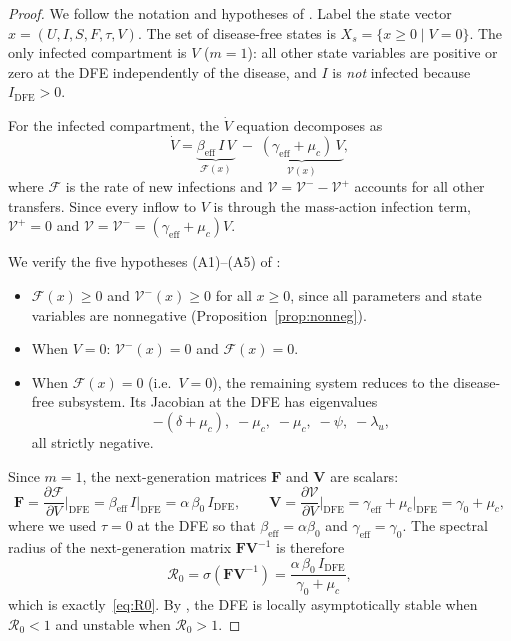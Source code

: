 \documentclass[11pt]{article}
\begin{document}
\begin{proof}
We follow the notation and hypotheses of \cite{vandenDriessche2002}. Label the state vector $x = (U, I, S, F, \tau, V)$. The set of disease-free states is $X_s = \{x \geq 0 \mid V = 0\}$. The only infected compartment is $V$ ($m = 1$): all other state variables are positive or zero at the DFE independently of the disease, and $I$ is \emph{not} infected because $I_{\mathrm{DFE}} > 0$.

For the infected compartment, the $\dot{V}$ equation decomposes as
\[
\dot{V} = \underbrace{\beta_{\mathrm{eff}}\,I\,V}_{\mathcal{F}(x)}
       \;-\; \underbrace{(\gamma_{\mathrm{eff}} + \mu_c)\,V}_{\mathcal{V}(x)},
\]
where $\mathcal{F}$ is the rate of new infections and $\mathcal{V} = \mathcal{V}^{-} - \mathcal{V}^{+}$ accounts for all other transfers. Since every inflow to $V$ is through the mass-action infection term, $\mathcal{V}^{+} = 0$ and $\mathcal{V} = \mathcal{V}^{-} = (\gamma_{\mathrm{eff}} + \mu_c)V$.

We verify the five hypotheses (A1)--(A5) of \cite{vandenDriessche2002}:
\begin{itemize}[leftmargin=1.5em]
    \item $\mathcal{F}(x) \geq 0$ and $\mathcal{V}^{-}(x) \geq 0$ for all $x \geq 0$, since all parameters and state variables are nonnegative (Proposition~\ref{prop:nonneg}).
    \item When $V = 0$: $\mathcal{V}^{-}(x) = 0$ and $\mathcal{F}(x) = 0$.
    \item When $\mathcal{F}(x) = 0$ (i.e.\ $V = 0$), the remaining system reduces to the disease-free subsystem. Its Jacobian at the DFE has eigenvalues
    \[
    -(\delta + \mu_c),\; -\mu_c,\; -\mu_c,\; -\psi,\; -\lambda_u,
    \]
    all strictly negative.
\end{itemize}

Since $m = 1$, the next-generation matrices $\mathbf{F}$ and $\mathbf{V}$ are scalars:
\[
\mathbf{F} = \frac{\partial \mathcal{F}}{\partial V}\bigg|_{\mathrm{DFE}}
           = \beta_{\mathrm{eff}}\,I\big|_{\mathrm{DFE}}
           = \alpha\,\beta_0\,I_{\mathrm{DFE}},
\qquad
\mathbf{V} = \frac{\partial \mathcal{V}}{\partial V}\bigg|_{\mathrm{DFE}}
           = \gamma_{\mathrm{eff}} + \mu_c\big|_{\mathrm{DFE}}
           = \gamma_0 + \mu_c,
\]
where we used $\tau = 0$ at the DFE so that $\beta_{\mathrm{eff}} = \alpha\beta_0$ and $\gamma_{\mathrm{eff}} = \gamma_0$. The spectral radius of the next-generation matrix $\mathbf{F}\mathbf{V}^{-1}$ is therefore
\[
\mathcal{R}_0 = \sigma(\mathbf{F}\mathbf{V}^{-1})
             = \frac{\alpha\,\beta_0\,I_{\mathrm{DFE}}}{\gamma_0 + \mu_c},
\]
which is exactly~\eqref{eq:R0}. By \cite[Theorem~2]{vandenDriessche2002}, the DFE is locally asymptotically stable when $\mathcal{R}_0 < 1$ and unstable when $\mathcal{R}_0 > 1$.
\end{proof}
\end{document}
